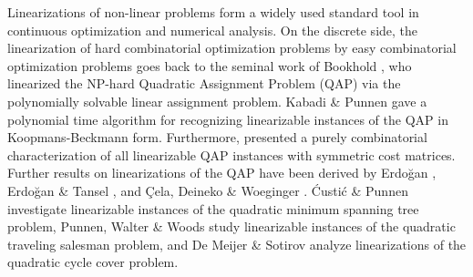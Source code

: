 Linearizations of non-linear problems form a widely used standard tool in continuous 
optimization and numerical analysis.
On the discrete side, the linearization of hard combinatorial optimization problems by easy 
combinatorial optimization problems goes back to the seminal work of Bookhold \cite{bookhold1990contribution}, 
who linearized the NP-hard Quadratic Assignment Problem (QAP) via the polynomially solvable 
linear assignment problem.
Kabadi \& Punnen \cite{kabadi2011n,punnen2013linear} gave a polynomial time algorithm for recognizing 
linearizable instances of the QAP in Koopmans-Beckmann form.
Furthermore, \cite{punnen2013linear} presented a purely combinatorial characterization of all linearizable
QAP instances with symmetric cost matrices.
Further results on linearizations of the QAP have been derived by
Erdo\u{g}an \cite{Erdogan2006}, Erdo\u{g}an \& Tansel \cite{ErTa2007,ErTa2011}, and 
\c{C}ela, Deineko \& Woeginger \cite{CeDeWo2016}.
{\'C}usti{\'c} \& Punnen \cite{CuPu2018} investigate linearizable instances of the quadratic minimum spanning tree problem,
Punnen, Walter \& Woods \cite{PuWaWo2017} study linearizable instances of the quadratic traveling salesman problem, and
De Meijer \& Sotirov \cite{deMeSo2020} analyze linearizations of the quadratic cycle cover problem.

